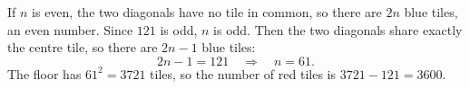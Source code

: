 If $n$ is even, the two diagonals have no tile in common, so there are $2n$ blue tiles, an even number. Since $121$ is odd, $n$ is odd. Then the two diagonals share exactly the centre tile, so there are $2n-1$ blue tiles:
\[2n-1=121\quad\Longrightarrow\quad n=61.\]
The floor has $61^2=3721$ tiles, so the number of red tiles is $3721-121=\boxed{3600}$.
